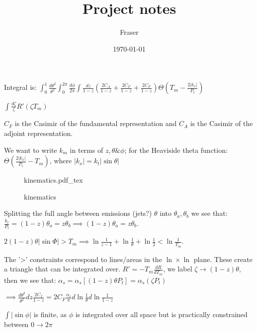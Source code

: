\documentclass{article}
\title{Project notes}
\author{Fraser}
\date{\today}
\newcommand{\incfig}[1]{%
    \def\svgwidth{\columnwidth}
    {#1.pdf_tex}
}
\begin{document}
Integral is: $\int_{0}^{1} \frac{d\theta ^2}{\theta ^2} \int_{0}^{2\pi} \frac{d\phi}{2\pi} \int \frac{dz}{1-z} \left( \frac{2C_A}{1-z} + \frac{2C_F}{1-z} + \frac{2C_F}{1-z} \right) \Theta \left( T_m - \frac{2|k_x|}{P_t} \right)$

$\int \frac{d\zeta}{\zeta} R'(\zeta T_m)$

$C_F$ is the Casimir of the fundamental representation and $C_A$ is the Casimir of the adjoint representation.

We want to write $k_m$ in terms of $z, \theta \& \phi$; for the Heaviside theta function:
$\Theta \left( \frac{2|k_x|}{P_t} - T_m \right)$, where $|k_x| = k_t|\sin{\theta}|$ 

\begin{figure}[ht]
    \centering
    \incfig{kinematics}
    \caption{kinematics}
    \label{fig:kinematics}
\end{figure}

Splitting the full angle between emissions (jets?) $\theta$ into $\theta _a, \theta _b$ we see that:
$\frac{k_t}{P_t} = (1-z)\theta_a = z\theta_b \implies (1-z)\theta_a = z\theta_b$.

$2(1-z) \theta |\sin{\Phi}| > T_m \implies \ln{\frac{1}{z-1}} + \ln{\frac{1}{\theta}} + \ln{\frac{1}{2}} < \ln{\frac{1}{T_m}}$.

The '>' constraints correspond to lines/areas in the $\ln \times \ln$ plane. These create a triangle that can be integrated over.
$R' = -T_m \frac{dR}{dT_m}$, we label $\zeta \to (1-z)\theta$, then we see that:
$\alpha _s = \alpha _s[(1-z)\theta P_t] = \alpha _s (\zeta P_t)$

$\implies \frac{d\theta^2}{\theta^2} dz \frac{2C_f}{1-z} = 2C_F \frac{\alpha _s}{\pi} d\ln{\frac{1}{\theta}} d\ln{\frac{1}{1-z}}$

$\int |\sin{\phi}|$ is finite, as $\phi$ is integrated over all space but is practically constrained between $0 \to 2\pi$
\end{document}

